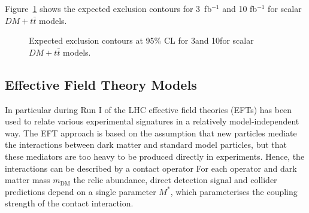 \clearpage
Figure~\ref{fig:limits_DMtt_S} shows the expected exclusion contours for  3~fb$^{-1}$ and 10 fb$^{-1}$ for scalar $DM+t\bar{t}$ models. 

\begin{figure}[h!]
  \centering
  \caption{\label{fig:limits_DMtt_S} Expected exclusion contours at 95\% CL for 3\fbinv and 10\fbinv for  scalar $DM+t\bar{t}$ models. }
\end{figure}


\subsection{Effective Field Theory Models}


In particular during Run I of the LHC effective field theories (EFTs) has been used to relate various experimental signatures in a relatively model-independent way. 
The EFT approach is based on the assumption that new particles mediate the interactions between dark matter and standard model particles, but that these mediators are too heavy to be
 produced directly in experiments. Hence, the interactions can be described by a contact operator For each operator and dark matter mass $m_\textrm{DM}$ the relic abundance, direct detection signal
 and collider predictions depend on a single parameter $M^*$, which parameterises the coupling strength of the contact interaction. 

